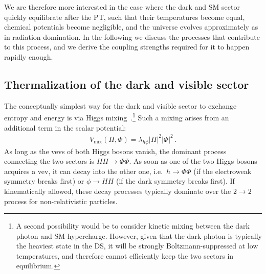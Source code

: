 We are therefore more interested in the case where the dark and \ac{SM} sector quickly equilibrate after the \ac{PT}, such that their temperatures become equal, chemical potentials become negligible, and the universe evolves approximately as in radiation domination. In the following we discuss the processes that contribute to this process, and we derive the coupling strengths required for it to happen rapidly enough.

\subsection{Thermalization of the dark and visible sector}
\label{sec:DSthermalization}

The conceptually simplest way for the dark and visible sector to exchange entropy and energy is via Higgs
mixing~\cite{Schabinger:2005ei,Patt:2006fw,Weihs:2011wp,Duerr:2016tmh,Li:2023bxy}.\footnote{A second possibility would be to consider kinetic mixing between the dark photon and \ac{SM} hypercharge. However, given that the dark photon is typically the heaviest state in the \ac{DS}, it will be strongly Boltzmann-suppressed at low temperatures, and therefore cannot efficiently keep the two sectors in equilibrium.} Such a mixing arises from an additional term in the scalar potential:
\begin{align}
	V_\text{mix}(H, \Phi) = \lambda_{h\phi} |H|^2 |\Phi|^2 \, .
\end{align}
As long as the \acp{vev} of both Higgs bosons vanish, the dominant  process connecting the two sectors is $H H \to \Phi \Phi$. As soon as one of the two Higgs bosons acquires a \ac{vev}, it can decay into the other one, i.e.~$h \to \Phi \Phi$ (if the electroweak symmetry breaks first) or $\phi \to H H$ (if the dark symmetry breaks first). If kinematically allowed, these decay processes typically dominate over the $2 \to 2$ process for non-relativistic particles.

